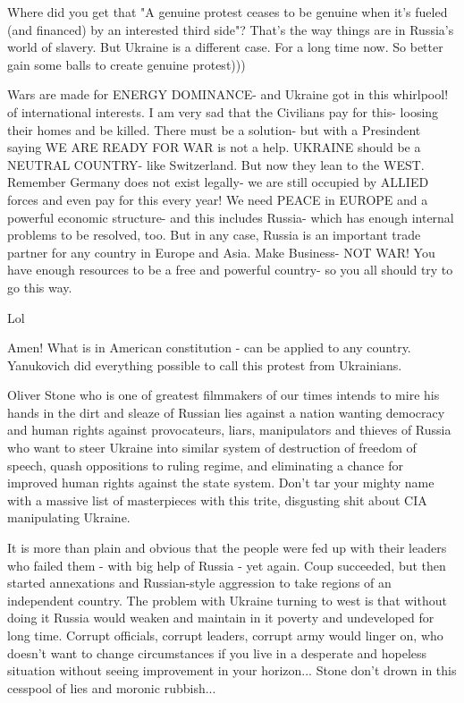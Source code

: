 \begin{itemize}
\begin{itemize}

Where did you get that "A genuine protest ceases to be genuine when it's fueled
(and financed) by an interested third side"? That's the way things are in
Russia's world of slavery. But Ukraine is a different case. For a long time
now. So better gain some balls to create genuine protest)))


Wars are made for ENERGY DOMINANCE- and Ukraine got in this whirlpool! of
international interests. I am very sad that the Civilians pay for this- loosing
their homes and be killed. There must be a solution- but with a Presindent
saying WE ARE READY FOR WAR is not a help. UKRAINE should be a NEUTRAL COUNTRY-
like Switzerland. But now they lean to the WEST. Remember Germany does not
exist legally- we are still occupied by ALLIED forces and even pay for this
every year! We need PEACE in EUROPE and a powerful economic structure- and this
includes Russia- which has enough internal problems to be resolved, too. But in
any case, Russia is an important trade partner for any country in Europe and
Asia. Make Business- NOT WAR! You have enough resources to be a free and
powerful country- so you all should try to go this way.

Lol


Amen! What is in American constitution - can be applied to any country.
Yanukovich did everything possible to call this protest from Ukrainians.


Oliver Stone who is one of greatest filmmakers of our times intends to mire his
hands in the dirt and sleaze of Russian lies against a nation wanting democracy
and human rights against provocateurs, liars, manipulators and thieves of
Russia who want to steer Ukraine into similar system of destruction of freedom
of speech, quash oppositions to ruling regime, and eliminating a chance for
improved human rights against the state system. Don't tar your mighty name with
a massive list of masterpieces with this trite, disgusting shit about CIA
manipulating Ukraine.

It is more than plain and obvious that the people were fed up with their
leaders who failed them - with big help of Russia - yet again. Coup succeeded,
but then started annexations and Russian-style aggression to take regions of an
independent country. The problem with Ukraine turning to west is that without
doing it Russia would weaken and maintain in it poverty and undeveloped for
long time. Corrupt officials, corrupt leaders, corrupt army would linger on,
who doesn't want to change circumstances if you live in a desperate and
hopeless situation without seeing improvement in your horizon... Stone don't
drown in this cesspool of lies and moronic rubbish...


\end{itemize}
\end{itemize}
